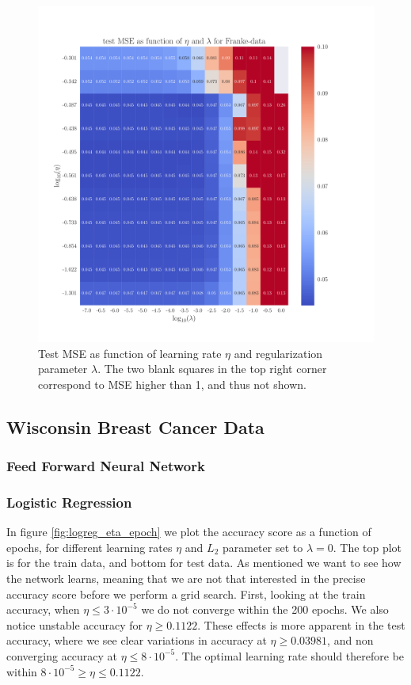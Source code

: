\documentclass[12pt]{extarticle}
\begin{document}
\begin{figure}[h]
	\includegraphics[width=\linewidth]{plots/NN_Franke__eta_lambda__test_MSE__228448.pdf}
	\caption{Test MSE as function of learning rate $\eta$ and regularization parameter $\lambda$. The two blank squares in the top right corner correspond to MSE higher than 1, and thus not shown.}\label{fig:NN_lambda}
\end{figure}


\clearpage
\subsection{Wisconsin Breast Cancer Data}
\subsubsection{Feed Forward Neural Network}



\subsubsection{Logistic Regression}

In figure \ref{fig:logreg_eta_epoch} we plot the accuracy score as a function of epochs, for different learning rates $\eta$ and $L_2$ parameter set to $\lambda = 0$. The top plot is for the train data, and bottom for test data. As mentioned we want to see how the network learns, meaning that we are not that interested in the precise accuracy score before we perform a grid search. First, looking at the train accuracy, when $\eta \leq 3\cdot 10^{-5}$ we do not converge within the 200 epochs. We also notice unstable accuracy for $\eta\geq 0.1122$. These effects is more apparent in the test accuracy, where we see clear variations in accuracy at $\eta \geq 0.03981$, and non converging accuracy at $\eta\leq 8\cdot 10^{-5}$. The optimal learning rate should therefore be within $8\cdot 10^{-5} \geq \eta \leq 0.1122$.
\end{document}
